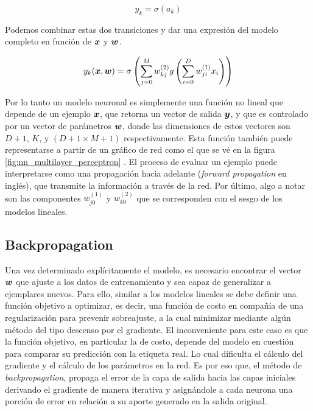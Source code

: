 \begin{equation}
    y_{k} = \sigma\left( a_k \right)
\end{equation}

Podemos combinar estas dos transiciones y dar una expresión del modelo completo
en función de $\boldsymbol{x}$ y $\boldsymbol{w}$.

\begin{equation}
    y_k(\boldsymbol{x}, \boldsymbol{w}) = \sigma\left(
                \sum_{j=0}^{M} w_{kj}^{(2)}
                    g\left( \sum_{i = 0}^{D} w_{ji}^{(1)} x_{i}
                \right)
            \right)
\end{equation}

Por lo tanto un modelo neuronal es simplemente una función no lineal que depende
de un ejemplo $\boldsymbol{x}$, que retorna un vector de salida $\boldsymbol{y}$, y que es
controlado por un vector de parámetros $\boldsymbol{w}$, donde las dimensiones de
estos vectores son $D + 1$, $K$, y $(D + 1 \times M + 1)$ respectivamente. Esta
función también puede representarse a partir de un gráfico de red como el que se
vé en la figura \ref{fig:nn_multilayer_perceptron} . El proceso de evaluar un
ejemplo puede interpretarse como una propagación hacia adelante (\emph{forward
propagation} en inglés), que transmite la información a través de la red. Por
último, algo a notar son las componentes $w_{j0}^{(1)}$ y $w_{k0}^{(2)}$ que se
corresponden con el sesgo de los modelos lineales.

\subsection{Backpropagation}
\label{subch:backpropagation}

Una vez determinado explícitamente el modelo, es necesario encontrar el vector
$\boldsymbol{w}$ que ajuste a los datos de entrenamiento y sea capaz de generalizar a
ejemplares nuevos. Para ello, similar a los modelos lineales se debe definir una
función objetivo a optimizar, es decir, una función de costo en compañía de una
regularización para prevenir sobreajuste, a la cual minimizar mediante algún
método del tipo descenso por el gradiente. El inconveniente para este caso es
que la función objetivo, en particular la de costo, depende del modelo en
cuestión para comparar su predicción con la etiqueta real. Lo cual dificulta el
cálculo del gradiente y el cálculo de los parámetros en la red. Es por eso que,
el método de \emph{backpropagation}, propaga el error de la capa de salida hacia
las capas iniciales derivando el gradiente de manera iterativa y asignándole a
cada neurona una porción de error en relación a su aporte generado en la salida
original.

